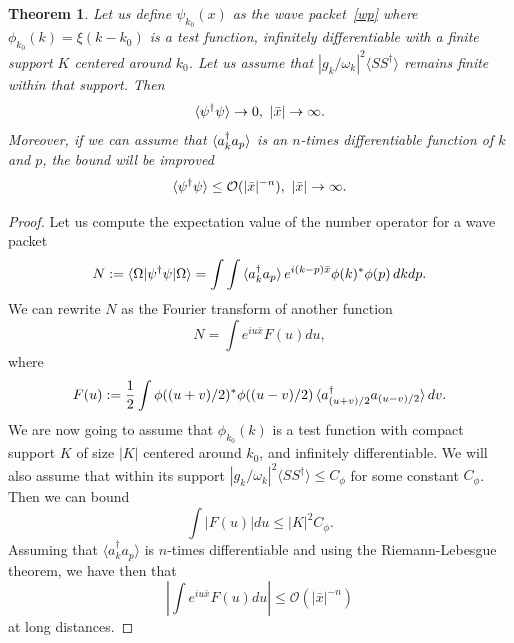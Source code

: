 \documentclass[notitlepage, prx, preprint, amsmath,superscriptaddress,amssymb]{revtex4-1}
\newtheorem{theorem}{Theorem}[section]
\begin{document}
\begin{theorem}
\label{theo:bound-x}
Let us define $\psi_{k_0}(x)$ as the wave packet\ \eqref{wp} where $\phi_{k_0}(k)=\xi(k-k_0)$ is a test function, infinitely differentiable with a finite support $K$ centered around $k_0$. Let us assume that $|g_k/\omega_k|^2\langle S S^\dagger \rangle$ remains finite within that support. Then
\begin{equation}
\label{nx}
\braket{\psi^\dagger \psi} \to 0,~|\bar x|\to\infty.
\end{equation}
Moreover, if we can assume that $\braket{a_k^\dagger a_p}$ is an $n$-times differentiable function of $k$ and $p$, the bound will be improved
\begin{equation}
\label{nx-imp}
\braket{\psi^\dagger \psi} \leq  \mathcal{O}(|\bar x|^{-n}), ~|\bar x|\to\infty.
\end{equation}
\end{theorem}

\begin{proof}
Let us compute the expectation value of the number operator for a wave packet
\begin{equation}
N := \braket{\Omega|\psi^\dagger\psi|\Omega}
= \int\int\braket{a_k^\dagger a_p} e^{i(k-p)\bar x} \phi(k)^*\phi(p)\,dk dp.
\end{equation}
We can rewrite $N$ as the Fourier transform of another function
\begin{equation}
N = \int e^{i u \bar x} F(u) du,
\end{equation}
where
\begin{equation}
F(u) := \frac{1}{2} \int \phi((u+v)/2)^*\phi((u-v)/2)
\braket{a_{(u+v)/2}^\dagger a_{(u-v)/2}}dv.
\end{equation}
We are now going to assume that $\phi_{k_0}(k)$ is a test function with compact support $K$ of size $|K|$ centered around $k_0$, and infinitely differentiable. We will also assume that within its support $|g_k/\omega_k|^2 \langle S S^\dagger \rangle \leq C_\phi$ for some constant $C_\phi$. Then we can bound
\begin{equation}
\int |F(u)|du \leq |K|^2 C_\phi.
\end{equation}
Assuming that $\langle a_k^\dagger a_p\rangle$ is $n$-times differentiable and 
using the Riemann-Lebesgue theorem, we have then that
\begin{equation}
\left|\int e^{i u \bar x} F(u)du\right| \leq \mathcal{O}\left(|\bar x|^{-n}\right)
\end{equation}
at long distances. 
\end{proof}
\end{document}
